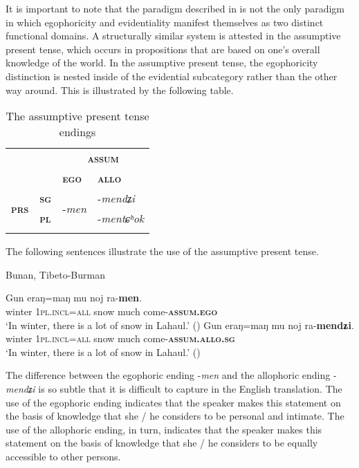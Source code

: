 \documentclass[output=paper]{langsci/langscibook}
\begin{document}
It is important to note that the paradigm described in  is not the only paradigm in which egophoricity and evidentiality manifest themselves as two distinct functional domains. A structurally similar system is attested in the assumptive present tense, which occurs in propositions that are based on one’s overall knowledge of the world. In the assumptive present tense, the egophoricity distinction is nested inside of the evidential subcategory rather than the other way around. This is illustrated by the following table.

\begin{table}
\begin{tabularx}{.5\textwidth}{lXll}
\lsptoprule
	&		&	\multicolumn{2}{c}{\textbf{\textsc{assum}}} \\
\cline{3-4}	
	&		&	\textbf{\textsc{ego}}	& \textbf{\textsc{allo}}	\\
\midrule
\multirow{2}{*}{\textbf{\textsc{prs}}}	&	\textbf{\textsc{sg}}	&	\multirow{2}{*}{-\textit{men}}	&	-\textit{mendʑi}	\\
	&	\textbf{\textsc{pl}}	&		&	-\textit{mentɕʰok}	\\
\lspbottomrule
\end{tabularx}
\caption{The assumptive present tense endings}
\label{tab:mw10}
\end{table}

The following sentences illustrate the use of the assumptive present tense.

\begin{exe}
	\ex Bunan, Tibeto-Burman\label{ex:mw4}
	\begin{xlist}
		\ex \label{ex:mw4a}
		\gll Gun	eraŋ=maŋ mu noj ra-\textbf{men}.\\
		winter 1\textsc{pl}.\textsc{incl}=\textsc{all} snow much come-\textbf{\textsc{assum}.\textsc{ego}}\\
		\trans ‘In winter, there is a lot of snow in Lahaul.’ (\citealt[477]{Widmer2017a})
		\ex \label{ex:mw4b}
		\gll Gun	eraŋ=maŋ mu noj ra-\textbf{mendʑi}.\\
		winter 1\textsc{pl}.\textsc{incl}=\textsc{all} snow much come-\textbf{\textsc{assum}.\textsc{allo}.\textsc{sg}}\\
		\trans ‘In winter, there is a lot of snow in Lahaul.’ (\citealt[477]{Widmer2017a})
	\end{xlist}
\end{exe}

The difference between the egophoric ending -\textit{men} and the allophoric ending -\textit{mendʑi} is so subtle that it is difficult to capture in the English translation. The use of the egophoric ending indicates that the speaker makes this statement on the basis of knowledge that she / he considers to be personal and intimate. The use of the allophoric ending, in turn, indicates that the speaker makes this statement on the basis of knowledge that she / he considers to be equally accessible to other persons.
\end{document}

